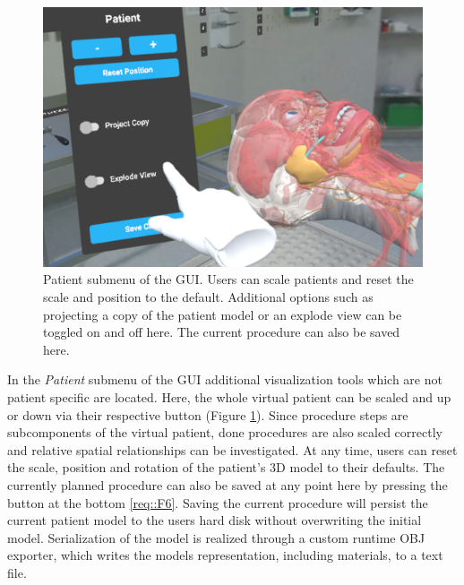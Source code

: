 \begin{figure}[ht]
  \centering
  \includegraphics[width=\linewidth]{images/implementation/user_interface/patient_submenu.png}
  \caption{\label{fig::PatientVisualization}Patient submenu of the GUI. Users can scale patients and reset the scale and position to the default. Additional options such as projecting a 
  copy of the patient model or an explode view can be toggled on and off here. The current procedure can also be saved here.}
\end{figure}

In the \emph{Patient} submenu of the GUI additional visualization tools which are not patient specific are located.
Here, the whole virtual patient can be scaled and up or down via their respective button (Figure \ref{fig::PatientVisualization}).
Since procedure steps are subcomponents of the virtual patient, done procedures are also scaled correctly and relative spatial relationships can be investigated.
At any time, users can reset the scale, position and rotation of the patient's 3D model to their defaults.
The currently planned procedure can also be saved at any point here by pressing the button at the bottom \ref{req::F6}.
Saving the current procedure will persist the current patient model to the users hard disk without overwriting the initial model.
Serialization of the model is realized through a custom runtime OBJ exporter, which writes the models representation, including materials, to a text file.

